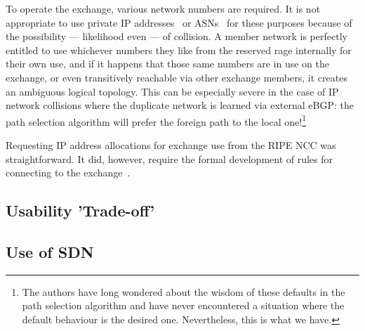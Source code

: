 To operate the exchange, various network numbers are required. It is
not appropriate to use private IP addresses~\cite{rfc1918}
or \acp{ASN}~\cite{rfc6996} for these purposes because of the
possibility --- likelihood even --- of collision. A member network is
perfectly entitled to use whichever numbers they like from the
reserved rage internally for their own use, and if it happens that
those same numbers are in use on the exchange, or even transitively
reachable via other exchange members, it creates an ambiguous logical
topology. This can be especially severe in the case of IP network
collisions where the duplicate network is learned via external eBGP:
the path selection algorithm will prefer the foreign path to the local
one!\footnote{The authors have long wondered about the wisdom of these
defaults in the path selection algorithm and have never encountered a
situation where the default behaviour is the desired
one. Nevertheless, this is what we have.}

Requesting IP address allocations for exchange use from the RIPE NCC
was straightforward. It did, however, require the formal development
of rules for connecting to the exchange~\cite{whixrules}. 



\subsection{Usability 'Trade-off'} \label{subsec:use}


\subsection{Use of SDN}


